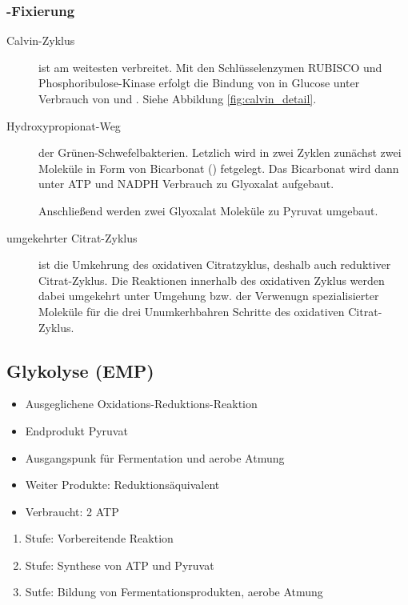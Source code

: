 \subsubsection{-Fixierung}
\begin{description}
	\item[Calvin-Zyklus] ist am weitesten verbreitet.
		Mit den Schlüsselenzymen RUBISCO und Phosphoribulose-Kinase
		erfolgt die Bindung von  in Glucose
		unter Verbrauch von  und .
		Siehe Abbildung \ref{fig:calvin_detail}.

	\item[Hydroxypropionat-Weg] der Grünen-Schwefelbakterien.
		Letzlich wird in zwei Zyklen zunächst zwei Moleküle 
		in Form von Bicarbonat () fetgelegt.
		Das Bicarbonat wird dann unter ATP und NADPH Verbrauch zu Glyoxalat aufgebaut.

		Anschließend werden zwei Glyoxalat Moleküle zu Pyruvat umgebaut.

	\item[umgekehrter Citrat-Zyklus] ist die Umkehrung des oxidativen Citratzyklus,
		deshalb auch reduktiver Citrat-Zyklus.
		Die Reaktionen innerhalb des oxidativen Zyklus werden dabei umgekehrt
		unter Umgehung bzw. der Verwenugn spezialisierter Moleküle für die 
		drei Unumkerhbahren Schritte des oxidativen Citrat-Zyklus.

\end{description}

\subsection{Glykolyse (EMP)}
\label{sec:glykolyse}
\begin{itemize}
	\item Ausgeglichene Oxidations-Reduktions-Reaktion
	\item Endprodukt Pyruvat
	\item Ausgangspunk für Fermentation und aerobe Atmung
	\item Weiter Produkte: Reduktionsäquivalent 
	\item Verbraucht: 2 ATP
	
\end{itemize}

\begin{enumerate}
	\item Stufe: Vorbereitende Reaktion
	\item Stufe: Synthese von ATP und Pyruvat
	\item Sutfe: Bildung von Fermentationsprodukten, aerobe Atmung
\end{enumerate}

